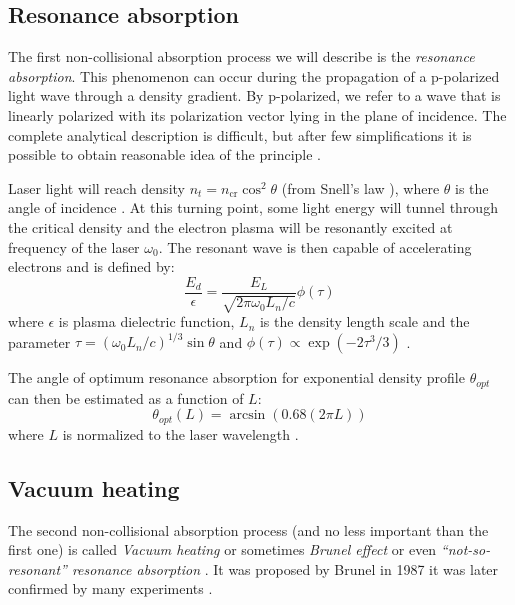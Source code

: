 \subsection*{Resonance absorption}
The first non-collisional absorption process we will describe is the \textit{resonance absorption}. This phenomenon can occur during the propagation of a p-polarized light wave through a density gradient. By p-polarized, we refer to a wave that is linearly polarized with its polarization vector lying in the plane of incidence. The complete analytical description is difficult, but after few simplifications it is possible to obtain reasonable idea of the principle \cite{laser-plasma6}. 

Laser light will reach density $n_t = n_{\mathrm{cr}}\cos^2\theta$ (from Snell's law \cite{absorption2}), where $\theta$ is the angle of incidence \cite{laser-plasma6}. At this turning point, some light energy will tunnel through the critical density and the electron plasma will be resonantly excited at frequency of the laser $\omega_0$. The resonant wave is then capable of accelerating electrons and is defined by:
\begin{equation}
	\label{eq:resonance}
	\frac{E_d}{\epsilon} = \frac{E_L}{\sqrt{2\pi\omega_0 L_n/c}}\phi\left(\tau\right)
\end{equation}
where $\epsilon$ is plasma dielectric function, $L_n$ is the density length scale and the parameter $\tau= \left(\omega_0 L_n/c\right)^{1/3}\sin\theta$ and $\phi\left(\tau\right) \propto \exp\left(-2\tau^3/3\right)$ \cite{absorption2,laser-plasma6}.

The angle of optimum resonance absorption for exponential density profile $\theta_{opt}$ can then be estimated as a function of $L$:
\begin{equation}
	\label{eq:res-opt}
	\theta_{opt}\left(L\right) = \arcsin\left(0.68(2\pi L)\right)
\end{equation}
where $L$ is normalized to the laser wavelength \cite{absorption1}.


\subsection*{Vacuum heating}
The second non-collisional absorption process (and no less important than the first one) is called \textit{Vacuum heating} or sometimes \textit{Brunel effect} or even \textit{“not-so-resonant” resonance absorption} \cite{brunel1987}. It was proposed by Brunel in 1987 it was later confirmed by many experiments \cite{absorption2}.

